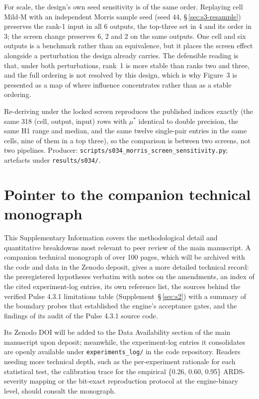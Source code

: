 \documentclass[pdflatex,sn-nature]{sn-jnl}%
\begin{document}
For scale, the design's own seed sensitivity is of the same order. Replaying cell Mild-M with an independent Morris sample seed (seed 44, \S\,\ref{sec:s3-resample}) preserves the rank-1 input in all 6 outputs, the top-three set in 4 and its order in 3; the screen change preserves 6, 2 and 2 on the same outputs. One cell and six outputs is a benchmark rather than an equivalence, but it places the screen effect alongside a perturbation the design already carries. The defensible reading is that, under both perturbations, rank~1 is more stable than ranks two and three, and the full ordering is not resolved by this design, which is why Figure~3 is presented as a map of where influence concentrates rather than as a stable ordering.

Re-deriving under the locked screen reproduces the published indices exactly (the same 318 (cell, output, input) rows with $\mu^{*}$ identical to double precision, the same H1 range and median, and the same twelve single-pair entries in the same cells, nine of them in a top three), so the comparison is between two screens, not two pipelines. Producer: \texttt{scripts/s034\_morris\_screen\_sensitivity.py}; artefacts under \texttt{results/s034/}.


\section{Pointer to the companion technical monograph}\label{sec:s14}

This Supplementary Information covers the methodological detail and quantitative breakdowns most relevant to peer review of the main manuscript. A companion technical monograph of over 100 pages, which will be archived with the code and data in the Zenodo deposit, gives a more detailed technical record: the preregistered hypotheses verbatim with notes on the amendments, an index of the cited experiment-log entries, its own reference list, the sources behind the verified Pulse 4.3.1 limitations table (Supplement~\S\,\ref{sec:s2}) with a summary of the boundary probes that established the engine's acceptance gates, and the findings of its audit of the Pulse 4.3.1 source code.

Its Zenodo DOI will be added to the Data Availability section of the main manuscript upon deposit; meanwhile, the experiment-log entries it consolidates are openly available under \texttt{experiments\_log/} in the code repository. Readers needing more technical depth, such as the per-experiment rationale for each statistical test, the calibration trace for the empirical \{0.26, 0.60, 0.95\} ARDS-severity mapping or the bit-exact reproduction protocol at the engine-binary level, should consult the monograph.
\end{document}
